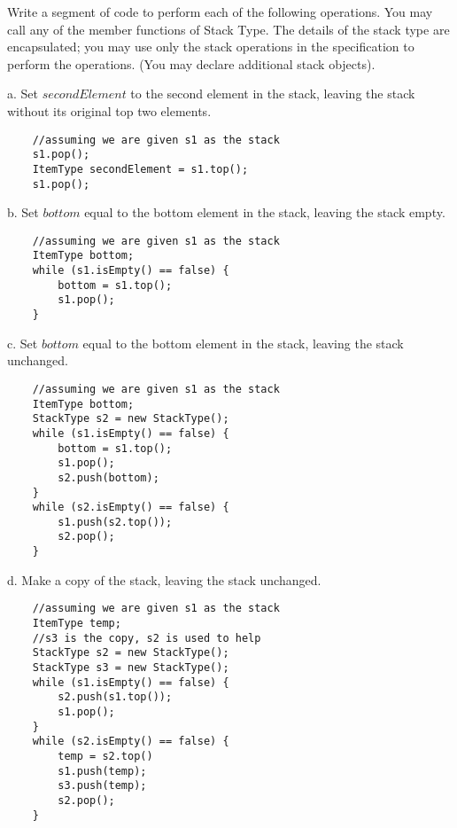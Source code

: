 \documentclass[12pt]{article}
\newenvironment{problem}[2][Problem]{\begin{trivlist}
\item[\hskip \labelsep {\bfseries #1}\hskip \labelsep {\bfseries #2.}]}{\end{trivlist}}
\begin{document}
\begin{problem}{3 (Stacks)}
    Write a segment of code to perform each of the following operations. You
    may call any of the member functions of Stack Type. The details of the stack type are encapsulated;
    you may use only the stack operations in the specification to perform the operations. (You may
    declare additional stack objects). 

    a. Set $secondElement$ to the second element in the stack, leaving the stack without its original top two elements.
\begin{verbatim}
    //assuming we are given s1 as the stack
    s1.pop();
    ItemType secondElement = s1.top();
    s1.pop();
\end{verbatim}  

    b. Set $bottom$ equal to the bottom element in the stack, leaving the stack empty.
\begin{verbatim}
    //assuming we are given s1 as the stack
    ItemType bottom;
    while (s1.isEmpty() == false) {
        bottom = s1.top();
        s1.pop();
    }
\end{verbatim}    

    c. Set $bottom$ equal to the bottom element in the stack, leaving the stack unchanged.
\begin{verbatim}
    //assuming we are given s1 as the stack
    ItemType bottom;
    StackType s2 = new StackType();
    while (s1.isEmpty() == false) {
        bottom = s1.top();
        s1.pop();
        s2.push(bottom);
    }
    while (s2.isEmpty() == false) {
        s1.push(s2.top());
        s2.pop();
    }
\end{verbatim}

\pagebreak
    d. Make a copy of the stack, leaving the stack unchanged.
\begin{verbatim}
    //assuming we are given s1 as the stack
    ItemType temp;
    //s3 is the copy, s2 is used to help
    StackType s2 = new StackType();
    StackType s3 = new StackType();
    while (s1.isEmpty() == false) {
        s2.push(s1.top());
        s1.pop();
    }
    while (s2.isEmpty() == false) {
        temp = s2.top()
        s1.push(temp);
        s3.push(temp);
        s2.pop();
    }
\end{verbatim}
\end{problem}
 
 
\end{document}
